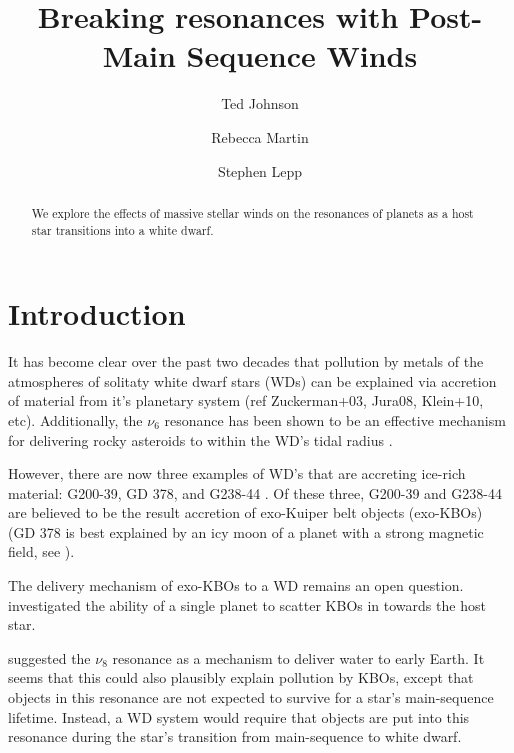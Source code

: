 \documentclass[twocolumn]{aastex631}
\begin{document}
\title{Breaking resonances with Post-Main Sequence Winds}

\author{Ted Johnson}

\author{Rebecca Martin}

\author{Stephen Lepp}


\begin{abstract}
    We explore the effects of massive stellar winds on the resonances
    of planets as a host star transitions into a white dwarf.
\end{abstract}

\section{Introduction}
\label{sec:intro}

It has become clear over the past two decades that pollution by metals
of the atmospheres of solitaty white dwarf stars (WDs) can be explained
via accretion of material from it's planetary system (ref Zuckerman+03, Jura08, Klein+10, etc). 
Additionally, the $\nu_6$ resonance has been shown to be an
effective mechanism for delivering rocky asteroids to within
the WD's tidal radius \citep{smallwood2021}.

However, there are now three examples of WD's that are accreting ice-rich
material: G200-39, GD 378, and G238-44 \citep[][, respectively]{xu2017,klein2021,johnson2022}.
Of these three, G200-39 and G238-44 are believed to be the result accretion
of exo-Kuiper belt objects (exo-KBOs) (GD 378 is best explained by an icy moon
of a planet with a strong magnetic field, see \citet{doyle2021}).

The delivery mechanism of exo-KBOs to a WD remains an open question. 
\citet{bonsor2011} investigated the ability of a single planet to scatter
KBOs in towards the host star.

\citet{chen2019} suggested the $\nu_8$ resonance as a mechanism to
deliver water to early Earth. It seems that this could also plausibly
explain pollution by KBOs, except that objects in this resonance are
not expected to survive for a star's main-sequence lifetime. Instead,
a WD system would require that objects are put into this resonance during
the star's transition from main-sequence to white dwarf.
\end{document}
